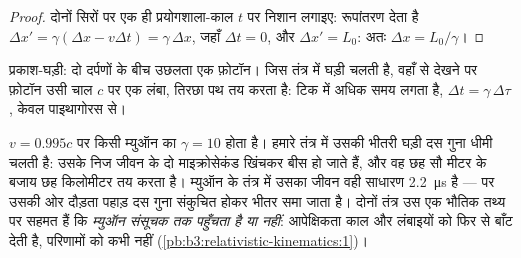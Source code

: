 \begin{proof}
दोनों सिरों पर एक ही प्रयोगशाला-काल $t$ पर निशान लगाइए: रूपांतरण देता है
$\Delta x' = \gamma(\Delta x - v\Delta t) = \gamma\,\Delta x$, जहाँ
$\Delta t = 0$, और $\Delta x' = L_0$: अतः $\Delta x = L_0/\gamma$।
\end{proof}

\begin{omfigure}

{\small प्रकाश-घड़ी: दो दर्पणों के बीच उछलता एक फ़ोटॉन। जिस तंत्र में
घड़ी चलती है, वहाँ से देखने पर फ़ोटॉन उसी चाल $c$ पर एक लंबा, तिरछा
पथ तय करता है: टिक में अधिक समय लगता है,
$\Delta t = \gamma\,\Delta\tau$, केवल पाइथागोरस से।}
\end{omfigure}

\begin{example}[म्युऑन, दो बार समझाया गया]\label{ex:b3:relativistic-kinematics:muon}
$v = 0.995c$ पर किसी म्युऑन का $\gamma = 10$ होता है। हमारे तंत्र में
उसकी भीतरी घड़ी दस गुना धीमी चलती है: उसके निज जीवन के दो माइक्रोसेकंड
खिंचकर बीस हो जाते हैं, और वह छह सौ मीटर के बजाय छह किलोमीटर तय करता है।
म्युऑन के तंत्र में उसका जीवन वही साधारण \qty{2.2}{\micro s} है ---
पर उसकी ओर दौड़ता पहाड़ दस गुना संकुचित होकर भीतर समा जाता है।
दोनों तंत्र उस एक भौतिक तथ्य पर सहमत हैं कि \emph{म्युऑन संसूचक तक
पहुँचता है या नहीं}: आपेक्षिकता काल और लंबाइयों को फिर से बाँट देती है,
परिणामों को कभी नहीं (\cref{pb:b3:relativistic-kinematics:1})।
\end{example}

